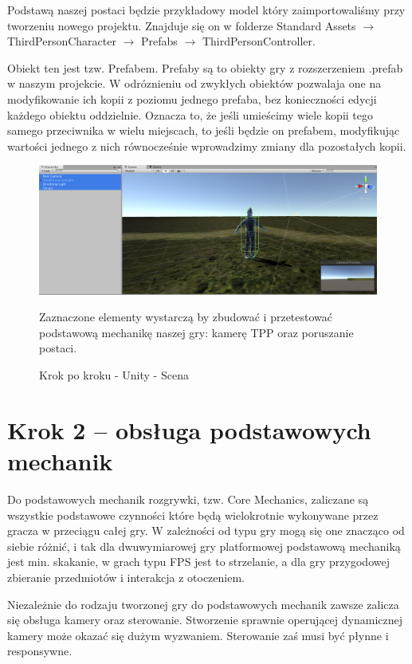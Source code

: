 \documentclass[brudnopis]{xmgr}
\begin{document}
Podstawą naszej postaci będzie przykładowy model który zaimportowaliśmy przy tworzeniu nowego projektu. Znajduje się on w folderze Standard Assets $\rightarrow$ ThirdPersonCharacter $\rightarrow$ Prefabs $\rightarrow$ ThirdPersonController.

Obiekt ten jest tzw. Prefabem. Prefaby są to obiekty gry z rozszerzeniem .prefab w naszym projekcie. W odróznieniu od zwykłych obiektów pozwalaja one na modyfikowanie ich kopii  z poziomu jednego prefaba, bez konieczności edycji każdego obiektu oddzielnie. Oznacza to, że jeśli umieścimy wiele kopii tego samego przeciwnika w wielu miejscach, to jeśli będzie on prefabem, modyfikując wartości jednego z nich równocześnie wprowadzimy zmiany dla pozostałych kopii.

\begin{figure}[!htb]
    \begin{center}
    \includegraphics[scale=0.25]{Screeny/UnityKrokPoKroku/krok1_endscreen.png}
    \end{center}
    \caption{Krok po kroku - Unity - Scena}
Zaznaczone elementy wystarczą by zbudować i przetestować podstawową mechanikę naszej gry: kamerę TPP oraz poruszanie postaci.
\end{figure}

\section{Krok 2 – obsługa podstawowych mechanik}

Do podstawowych mechanik rozgrywki, tzw. Core  Mechanics, zaliczane są wszystkie podstawowe czynności które będą wielokrotnie wykonywane przez gracza w przeciągu całej gry. W zależności od typu gry mogą się one znacząco od siebie różnić, i tak dla dwuwymiarowej gry platformowej podstawową mechaniką jest min. skakanie, w grach typu FPS jest to strzelanie, a dla gry przygodowej zbieranie przedmiotów i interakcja z otoczeniem.

Niezależnie do rodzaju tworzonej gry do podstawowych mechanik zawsze zalicza się obsługa kamery oraz sterowanie. Stworzenie sprawnie operującej dynamicznej kamery może okazać się dużym wyzwaniem. Sterowanie zaś musi być płynne i responsywne. 
\end{document}
